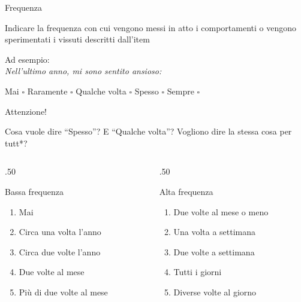 \documentclass[compress]{beamer}
\begin{document}
\begin{frame}
	\footnotesize
		\begin{block}{Frequenza}
		
		Indicare la frequenza con cui vengono messi in atto i comportamenti o vengono sperimentati i vissuti descritti dall'item
		
		Ad esempio: \\
		\emph{Nell'ultimo anno, mi sono sentito ansioso:}
		\begin{center}
	Mai	$\square$ \hspace{1.5mm} Raramente $\square$ \hspace{1.5mm} Qualche volta $\square$ \hspace{1.5mm} Spesso $\square$ \hspace{1.5mm} Sempre $\square$
		\end{center}
	\end{block}
	
	\pause
	\begin{center}
		Attenzione!
	\end{center}
	
	Cosa vuole dire ``Spesso''? E ``Qualche volta''? Vogliono dire la stessa cosa per tutt*?
	\vspace{-1.5mm}
	\begin{columns}[T]
		\begin{column}{.50\linewidth}
			\begin{center}
				Bassa frequenza
			\end{center}
			\footnotesize
			\begin{enumerate}
				\item Mai 
				\item Circa una volta l'anno
				\item Circa due volte l'anno
				\item Due volte al mese 
				\item Più di due volte al mese
			\end{enumerate}
		\end{column}
		\begin{column}{.50\linewidth}
					\begin{center}
			Alta frequenza
		\end{center}
		\begin{enumerate}
					\footnotesize
			\item Due volte al mese o meno 
			\item Una volta a settimana
			\item Due volte a settimana
			\item Tutti i giorni 
			\item Diverse volte al giorno
		\end{enumerate}
		\end{column}
	\end{columns} 
\end{frame}
\end{document}
